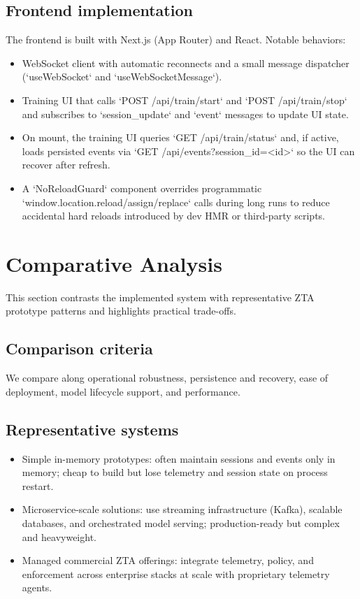 \documentclass[conference]{IEEEtran}
\begin{document}
\subsection{Frontend implementation}
The frontend is built with Next.js (App Router) and React. Notable behaviors:
\begin{itemize}[leftmargin=*]
  \item WebSocket client with automatic reconnects and a small message dispatcher (`useWebSocket` and `useWebSocketMessage`).
  \item Training UI that calls `POST /api/train/start` and `POST /api/train/stop` and subscribes to `session_update` and `event` messages to update UI state.
  \item On mount, the training UI queries `GET /api/train/status` and, if active, loads persisted events via `GET /api/events?session_id=<id>` so the UI can recover after refresh.
  \item A `NoReloadGuard` component overrides programmatic `window.location.reload/assign/replace` calls during long runs to reduce accidental hard reloads introduced by dev HMR or third-party scripts.
\end{itemize}

\section{Comparative Analysis}
This section contrasts the implemented system with representative ZTA prototype patterns and highlights practical trade-offs.

\subsection{Comparison criteria}
We compare along operational robustness, persistence and recovery, ease of deployment, model lifecycle support, and performance.

\subsection{Representative systems}
\begin{itemize}[leftmargin=*]
  \item Simple in-memory prototypes: often maintain sessions and events only in memory; cheap to build but lose telemetry and session state on process restart.
  \item Microservice-scale solutions: use streaming infrastructure (Kafka), scalable databases, and orchestrated model serving; production-ready but complex and heavyweight.
  \item Managed commercial ZTA offerings: integrate telemetry, policy, and enforcement across enterprise stacks at scale with proprietary telemetry agents.
\end{itemize}
\end{document}
